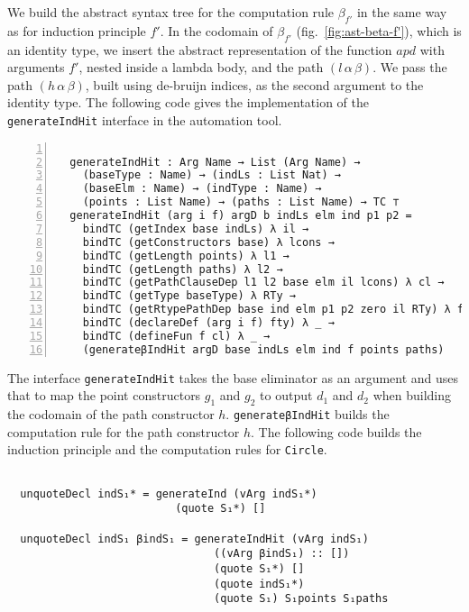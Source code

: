 \documentclass[sigplan,10pt]{acmart}
\begin{document}
We build the abstract syntax tree for the computation rule $\beta_{f'}$ in the same way as for induction principle $f'$. In the codomain of $\beta_{f'}$ (fig.~\ref{fig:ast-beta-f'}), which is an identity type, we insert the abstract representation of the function $apd$ with arguments $f'$, nested inside a lambda body, and the path $(l \, \alpha \, \beta)$. We pass the path $(h \, \alpha \, \beta)$, built using de-bruijn indices, as the second argument to the identity type. The following code gives the implementation of the {\tt generateIndHit} interface in the automation tool.

\begin{center}
\begingroup
\fontsize{7pt}{9pt}\selectfont
\begin{Verbatim}[frame = lines, rulecolor=\color{blue}, numbers = left, numbersep = 0pt]

  generateIndHit : Arg Name → List (Arg Name) → 
    (baseType : Name) → (indLs : List Nat) → 
    (baseElm : Name) → (indType : Name) → 
    (points : List Name) → (paths : List Name) → TC ⊤
  generateIndHit (arg i f) argD b indLs elm ind p1 p2 =
    bindTC (getIndex base indLs) λ il →
    bindTC (getConstructors base) λ lcons → 
    bindTC (getLength points) λ l1 →
    bindTC (getLength paths) λ l2 →
    bindTC (getPathClauseDep l1 l2 base elm il lcons) λ cl →
    bindTC (getType baseType) λ RTy →
    bindTC (getRtypePathDep base ind elm p1 p2 zero il RTy) λ fty →
    bindTC (declareDef (arg i f) fty) λ _ →
    bindTC (defineFun f cl) λ _ →
    (generateβIndHit argD base indLs elm ind f points paths)

\end{Verbatim}
\endgroup
\end{center}

The interface {\tt generateIndHit} takes the base eliminator as an argument and uses that to map the point constructors $g_1$ and $g_2$ to output $d_1$ and $d_2$ when building the codomain of the path constructor $h$. {\tt generateβIndHit} builds the computation rule for the path constructor $h$. The following code builds the induction principle and the computation rules for {\tt Circle}.

\begin{center}
\begingroup
\fontsize{8pt}{9pt}\selectfont
\begin{Verbatim}

  unquoteDecl indS₁* = generateInd (vArg indS₁*)
                          (quote S₁*) []

  unquoteDecl indS₁ βindS₁ = generateIndHit (vArg indS₁) 
                                ((vArg βindS₁) :: [])
                                (quote S₁*) []
                                (quote indS₁*)
                                (quote S₁) S₁points S₁paths

\end{Verbatim}
\endgroup
\end{center}
\end{document}
